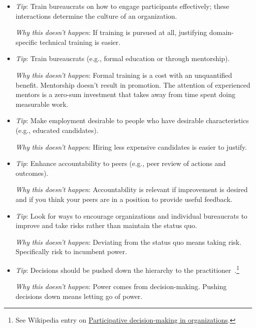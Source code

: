 \begin{itemize}
    \item \textit{Tip}: Train bureaucrats on how to engage participants effectively; these interactions determine the culture of an organization. 

    \textit{Why this doesn't happen}: If training is pursued at all, justifying domain-specific technical training is easier. 
    
    \item \textit{Tip}: Train bureaucrats (e.g., formal education or through mentorship).

    \textit{Why this doesn't happen}: Formal training is a cost with an unquantified benefit. Mentorship doesn't result in promotion. The attention of experienced mentors is a zero-sum investment that takes away from time spent doing measurable work.
    
    \item \textit{Tip}: Make employment desirable to people who have desirable characteristics (e.g., educated candidates).

    \textit{Why this doesn't happen}: Hiring less expensive candidates is easier to justify. 
    
    \item \textit{Tip}: Enhance accountability to peers (e.g., peer review of actions and outcomes).

    \textit{Why this doesn't happen}: Accountability is relevant if improvement is desired and if you think your peers are in a position to provide useful feedback. 
    
    \item \textit{Tip}: Look for ways to encourage organizations and individual bureaucrats to improve and take risks rather than maintain the status quo.

    \textit{Why this doesn't happen}: Deviating from the status quo means taking risk. Specifically risk to incumbent power. 
    
    \item \textit{Tip}: Decisions should be pushed down the hierarchy to the practitioner~\cite{2013_Marquet}.\footnote{See Wikipedia entry on \href{https://en.wikipedia.org/wiki/Participative_decision-making_in_organizations}{Participative decision-making in organizations}.
    }

    \textit{Why this doesn't happen}: Power comes from decision-making. Pushing decisions down means letting go of power.
    

\end{itemize}
